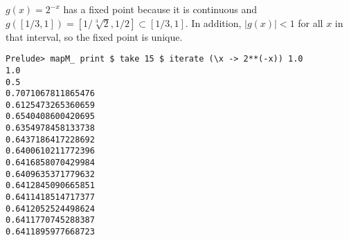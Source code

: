 $g(x) = 2^{-x}$ has a fixed point because it is continuous and $g([1/3,1]) =
[1/\sqrt[3]{2}, 1/2] \subset [1/3,1]$.  In addition, $|g(x)| < 1$ for all $x$
in that interval, so the fixed point is unique.

\begin{verbatim}
Prelude> mapM_ print $ take 15 $ iterate (\x -> 2**(-x)) 1.0
1.0
0.5
0.7071067811865476
0.6125473265360659
0.6540408600420695
0.6354978458133738
0.6437186417228692
0.6400610211772396
0.6416858070429984
0.6409635371779632
0.6412845090665851
0.6411418514717377
0.6412052524498624
0.6411770745288387
0.6411895977668723
\end{verbatim}
